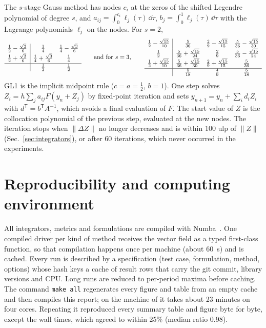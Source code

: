 The $s$-stage Gauss method has nodes $c_i$ at the zeros of the shifted Legendre polynomial of
degree $s$, and $a_{ij} = \int_0^{c_i}\ell_j(\tau)\,\dd\tau$, $b_j = \int_0^1\ell_j(\tau)\,\dd\tau$
with the Lagrange polynomials $\ell_j$ on the nodes. For $s = 2$,
\begin{equation*}
\begin{array}{c|cc}
\tfrac12 - \tfrac{\sqrt3}{6} & \tfrac14 & \tfrac14 - \tfrac{\sqrt3}{6} \\[2pt]
\tfrac12 + \tfrac{\sqrt3}{6} & \tfrac14 + \tfrac{\sqrt3}{6} & \tfrac14 \\[2pt]
\hline
 & \tfrac12 & \tfrac12
\end{array}
\qquad\text{and for } s = 3,\qquad
\begin{array}{c|ccc}
\tfrac12 - \tfrac{\sqrt{15}}{10} & \tfrac{5}{36} & \tfrac29 - \tfrac{\sqrt{15}}{15} & \tfrac{5}{36} - \tfrac{\sqrt{15}}{30} \\[2pt]
\tfrac12 & \tfrac{5}{36} + \tfrac{\sqrt{15}}{24} & \tfrac29 & \tfrac{5}{36} - \tfrac{\sqrt{15}}{24} \\[2pt]
\tfrac12 + \tfrac{\sqrt{15}}{10} & \tfrac{5}{36} + \tfrac{\sqrt{15}}{30} & \tfrac29 + \tfrac{\sqrt{15}}{15} & \tfrac{5}{36} \\[2pt]
\hline
 & \tfrac{5}{18} & \tfrac49 & \tfrac{5}{18}
\end{array}
\end{equation*}
GL1 is the implicit midpoint rule ($c = a = \tfrac12$, $b = 1$). One step solves
$Z_i = h\sum_j a_{ij}F(y_n + Z_j)$ by fixed-point iteration and sets
$y_{n+1} = y_n + \sum_i d_i Z_i$ with $d^\mathsf{T} = b^\mathsf{T}A^{-1}$, which avoids a final
evaluation of $F$. The start value of $Z$ is the collocation polynomial of the previous step,
evaluated at the new nodes. The iteration stops when $\|\Delta Z\|$ no longer decreases and is
within 100 ulp of $\|Z\|$ (Sec.~\ref{sec:integrators}), or after 60 iterations, which never
occurred in the experiments.

\section{Reproducibility and computing environment}
\label{app:environment}

All integrators, metrics and formulations are compiled with Numba~\cite{numba}. One compiled
driver per kind of method receives the vector field as a typed first-class function, so that
compilation happens once per machine (about 60~s) and is cached. Every run is described by a
specification (test case, formulation, method, options) whose hash keys a cache of result rows
that carry the git commit, library versions and CPU. Long runs are reduced to per-period
maxima before caching. The command \texttt{make all} regenerates every figure and table from
an empty cache and then compiles this report; on the machine of  it takes
about 23 minutes on four cores. Repeating it reproduced every summary table and figure byte
for byte, except the wall times, which agreed to within 25\% (median ratio 0.98).

\begin{table}[h]
\caption{\label{tab:environment}Computing environment of the results (T8).}
\centering\small

\end{table}
